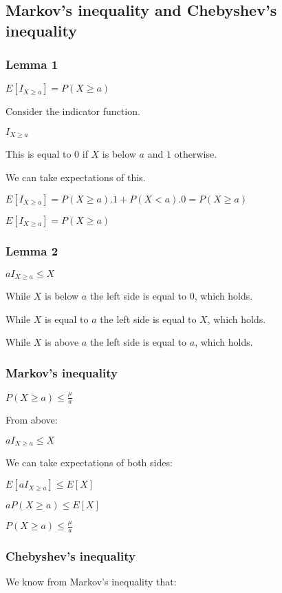 
\subsection{Markov's inequality and Chebyshev's inequality}
\subsubsection{Lemma 1}

\(E[I_{X\ge a}]=P(X\ge a)\)

Consider the indicator function.

\(I_{X\ge a}\)

This is equal to \(0\) if \(X\) is below \(a\) and \(1\) otherwise.

We can take expectations of this.

\(E[I_{X\ge a}]=P(X\ge a).1+P(X<a).0=P(X\ge a)\)

\(E[I_{X\ge a}]=P(X\ge a)\)

\subsubsection{Lemma 2}

\(aI_{X\ge a}\le X\)

While \(X\) is below \(a\) the left side is equal to \(0\), which holds.

While \(X\) is equal to \(a\) the left side is equal to \(X\), which holds.

While \(X\) is above \(a\) the left side is equal to \(a\), which holds.

\subsubsection{Markov’s inequality}

\(P(X\ge a)\le \frac{\mu  }{a}\)

From above:

\(aI_{X\ge a}\le X\)

We can take expectations of both sides:

\(E[aI_{X\ge a}]\le E[X]\)

\(aP(X\ge a)\le E[X]\)

\(P(X\ge a)\le \frac{\mu  }{a}\)

\subsubsection{Chebyshev’s inequality}

We know from Markov’s inequality that:

